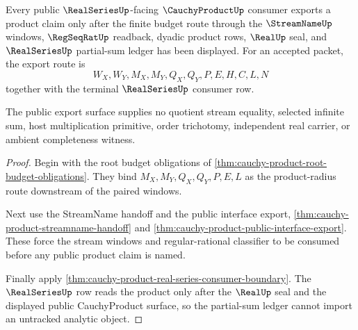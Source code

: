 \begin{theorem}
\label{thm:cauchy-product-public-real-series-budget-export}
Every public $\RealSeriesUp$-facing $\CauchyProductUp$ consumer exports a product claim only after the finite budget route through the $\StreamNameUp$ windows, $\RegSeqRatUp$ readback, dyadic product rows, $\RealUp$ seal, and $\RealSeriesUp$ partial-sum ledger has been displayed. For an accepted packet, the export route is
$$
W_X,W_Y,M_X,M_Y,Q_X,Q_Y,P,E,H,C,L,N
$$
together with the terminal $\RealSeriesUp$ consumer row.

The public export surface supplies no quotient stream equality, selected infinite sum, host multiplication primitive, order trichotomy, independent real carrier, or ambient completeness witness.
\end{theorem}
\begin{proof}
Begin with the root budget obligations of \autoref{thm:cauchy-product-root-budget-obligations}. They bind $M_X,M_Y,Q_X,Q_Y,P,E,L$ as the product-radius route downstream of the paired windows.

Next use the StreamName handoff and the public interface export, \autoref{thm:cauchy-product-streamname-handoff} and \autoref{thm:cauchy-product-public-interface-export}. These force the stream windows and regular-rational classifier to be consumed before any public product claim is named.

Finally apply \autoref{thm:cauchy-product-real-series-consumer-boundary}. The $\RealSeriesUp$ row reads the product only after the $\RealUp$ seal and the displayed public CauchyProduct surface, so the partial-sum ledger cannot import an untracked analytic object.
\end{proof}

